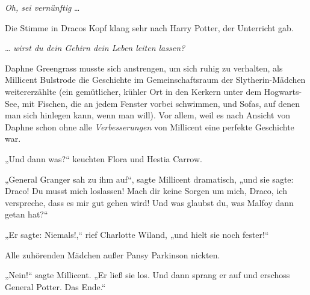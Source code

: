 \emph{Oh, sei vernünftig} …

Die Stimme in Dracos Kopf klang sehr nach Harry Potter, der Unterricht gab.

… \emph{wirst du dein Gehirn dein Leben leiten lassen?}


Daphne Greengrass musste sich anstrengen, um sich ruhig zu verhalten, als Millicent Bulstrode die Geschichte im Gemeinschaftsraum der Slytherin-Mädchen weitererzählte (ein gemütlicher, kühler Ort in den Kerkern unter dem Hogwarts-See, mit Fischen, die an jedem Fenster vorbei schwimmen, und Sofas, auf denen man sich hinlegen kann, wenn man will). Vor allem, weil es nach Ansicht von Daphne schon ohne alle \emph{Verbesserungen} von Millicent eine perfekte Geschichte war.

„Und dann was?“ keuchten Flora und Hestia Carrow.

„General Granger sah zu ihm auf“, sagte Millicent dramatisch, „und sie sagte: Draco! Du musst mich loslassen! Mach dir keine Sorgen um mich, Draco, ich verspreche, dass es mir gut gehen wird! Und was glaubst du, was Malfoy dann getan hat?“

„Er sagte: Niemals!,“ rief Charlotte Wiland, „und hielt sie noch fester!“

Alle zuhörenden Mädchen außer Pansy Parkinson nickten.

„Nein!“ sagte Millicent.
„Er ließ sie los. Und dann sprang er auf und erschoss General Potter. Das Ende.“

